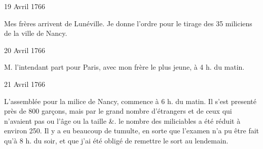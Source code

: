                      \begin{diary}{19 Avril 1766}{}
                        
                        
                           Mes
                              frères arrivent de Lunéville. Je donne
                           l'ordre pour le tirage des 35 miliciens de
                           la ville de Nancy. \bigskip
        
        
                     \end{diary}

                     \begin{diary}{20 Avril 1766}{}
                        
                        
                           M. l'intendant part pour
                              Paris, avec
                           mon frère le plus
                              jeune, à 4 h. du matin. \bigskip
        
        
                     \end{diary}

                     \begin{diary}{21 Avril 1766}{}
                        
                         L'assemblée pour la milice de Nancy, commence
                           à 6 h. du matin. Il s'est presenté près de
                           800 garçons, mais par le grand nombre
                           d'étrangers et de ceux qui n'avaient pas ou
                           l'âge ou la taille &. le nombre des miliciables
                           a été réduit à environ 250. Il y a eu
                           beaucoup de tumulte, en sorte que l'examen
                           n'a pu être fait qu'à 8 h. du soir, et que
                           j'ai été obligé de remettre le sort au lendemain. \bigskip
        
        
                     \end{diary}

